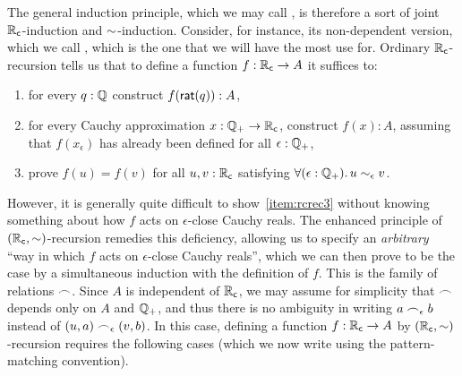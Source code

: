 The general induction principle, which we may call , is therefore a sort of joint $\mathbb{R}_\mathsf{c}$-induction and $\mathord\sim$-induction.
Consider, for instance, its non-dependent version, which we call , which is the one that we will have the most use for.
%
Ordinary $\mathbb{R}_\mathsf{c}$-recursion tells us that to define a function $f : \mathbb{R}_\mathsf{c} \to A$ it suffices to:
\begin{enumerate}
\item for every $q : \mathbb{Q}$ construct $f(\mathsf{rat}(q)) : A$,
\item for every Cauchy approximation $x : \mathbb{Q}_{+} \to \mathbb{R}_\mathsf{c}$, construct $f(x) : A$,
  assuming that $f(x_\epsilon)$ has already been defined for all $\epsilon : \mathbb{Q}_{+}$,
\item prove $f(u) = f(v)$ for all $u, v : \mathbb{R}_\mathsf{c}$ satisfying $\fall{\epsilon:\Qp} u\close\epsilon v$.\label{item:rcrec3}
\end{enumerate}
However, it is generally quite difficult to show~\ref{item:rcrec3} without knowing something about how $f$ acts on $\epsilon$-close Cauchy reals.
The enhanced principle of $(\mathbb{R}_\mathsf{c},\mathord\sim)$-recursion remedies this deficiency, allowing us to specify an \emph{arbitrary} ``way in which $f$ acts on $\epsilon$-close Cauchy reals'', which we can then prove to be the case by a simultaneous induction with the definition of $f$.
This is the family of relations $\frown$.
Since $A$ is independent of $\mathbb{R}_\mathsf{c}$, we may assume for simplicity that $\frown$ depends only on $A$ and $\mathbb{Q}_{+}$, and thus there is no ambiguity in writing $a\frown_\epsilon b$ instead of $(u,a) \frown_\epsilon (v,b)$.
In this case, defining a function $f:\mathbb{R}_\mathsf{c}\to A$ by $(\mathbb{R}_\mathsf{c},\mathord\sim)$-recursion requires the following cases (which we now write using the pattern-matching convention).
